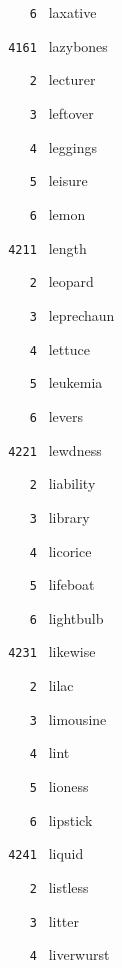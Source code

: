 \documentclass[11pt]{article}
\begin{document}
\begin{multicols}{6}
\noindent \texttt{ \ \ \ 6 } laxative  \par
\vspace{3mm}
\noindent \texttt{ 4161 } lazybones  \par
\noindent \texttt{ \ \ \ 2 } lecturer  \par
\noindent \texttt{ \ \ \ 3 } leftover  \par
\noindent \texttt{ \ \ \ 4 } leggings  \par
\noindent \texttt{ \ \ \ 5 } leisure  \par
\noindent \texttt{ \ \ \ 6 } lemon  \par
\noindent \texttt{ 4211 } length  \par
\noindent \texttt{ \ \ \ 2 } leopard  \par
\noindent \texttt{ \ \ \ 3 } leprechaun  \par
\noindent \texttt{ \ \ \ 4 } lettuce  \par
\noindent \texttt{ \ \ \ 5 } leukemia  \par
\noindent \texttt{ \ \ \ 6 } levers  \par
\vspace{3mm}
\noindent \texttt{ 4221 } lewdness  \par
\noindent \texttt{ \ \ \ 2 } liability  \par
\noindent \texttt{ \ \ \ 3 } library  \par
\noindent \texttt{ \ \ \ 4 } licorice  \par
\noindent \texttt{ \ \ \ 5 } lifeboat  \par
\noindent \texttt{ \ \ \ 6 } lightbulb  \par
\vspace{3mm}
\noindent \texttt{ 4231 } likewise  \par
\noindent \texttt{ \ \ \ 2 } lilac  \par
\noindent \texttt{ \ \ \ 3 } limousine  \par
\noindent \texttt{ \ \ \ 4 } lint  \par
\noindent \texttt{ \ \ \ 5 } lioness  \par
\noindent \texttt{ \ \ \ 6 } lipstick  \par
\vspace{3mm}
\noindent \texttt{ 4241 } liquid  \par
\noindent \texttt{ \ \ \ 2 } listless  \par
\noindent \texttt{ \ \ \ 3 } litter  \par
\noindent \texttt{ \ \ \ 4 } liverwurst  \par

\end{multicols}
\end{document}
